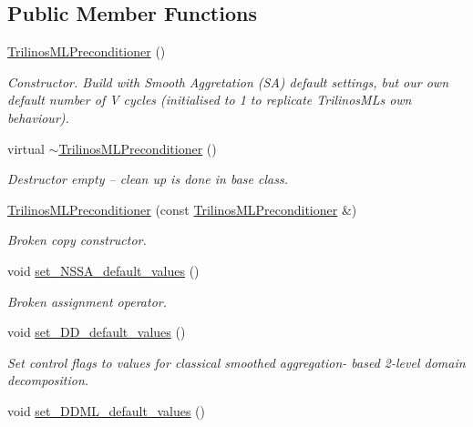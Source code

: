 \subsection*{Public Member Functions}
\begin{DoxyCompactItemize}
\item 
\hyperlink{classoomph_1_1TrilinosMLPreconditioner_a98c9e7ce547973570a53b138912ea20a}{Trilinos\+M\+L\+Preconditioner} ()
\begin{DoxyCompactList}\small\item\em Constructor. Build with Smooth Aggretation (SA) default settings, but our own default number of V cycles (initialised to 1 to replicate Trilinos\+ML\textquotesingle{}s own behaviour). \end{DoxyCompactList}\item 
virtual \hyperlink{classoomph_1_1TrilinosMLPreconditioner_a230cf9de1fd411e617d84e32359e8713}{$\sim$\+Trilinos\+M\+L\+Preconditioner} ()
\begin{DoxyCompactList}\small\item\em Destructor empty -- clean up is done in base class. \end{DoxyCompactList}\item 
\hyperlink{classoomph_1_1TrilinosMLPreconditioner_a2138392fdc682b540eb00ba346f6dcf1}{Trilinos\+M\+L\+Preconditioner} (const \hyperlink{classoomph_1_1TrilinosMLPreconditioner}{Trilinos\+M\+L\+Preconditioner} \&)
\begin{DoxyCompactList}\small\item\em Broken copy constructor. \end{DoxyCompactList}\item 
void \hyperlink{classoomph_1_1TrilinosMLPreconditioner_aa52463ce0cef9095c44dfaa08afd53bd}{set\+\_\+\+N\+S\+S\+A\+\_\+default\+\_\+values} ()
\begin{DoxyCompactList}\small\item\em Broken assignment operator. \end{DoxyCompactList}\item 
void \hyperlink{classoomph_1_1TrilinosMLPreconditioner_aeb180c16b994e172649e7bafd1818bcb}{set\+\_\+\+D\+D\+\_\+default\+\_\+values} ()
\begin{DoxyCompactList}\small\item\em Set control flags to values for classical smoothed aggregation-\/ based 2-\/level domain decomposition. \end{DoxyCompactList}\item 
void \hyperlink{classoomph_1_1TrilinosMLPreconditioner_ac34c8a71081f1d7b50e478d541939e2c}{set\+\_\+\+D\+D\+M\+L\+\_\+default\+\_\+values} ()

\end{DoxyCompactItemize}
